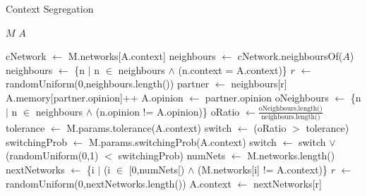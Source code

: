 \documentclass{article}
\begin{document}
  
    \begin{algorithm}
    \caption{Context Segregation}
    \label{model:context_segregation}
    \begin{algorithmic}
    \vspace{0.5em}
    \STATE $M$ 
    \STATE $A$ 
    \\ \hrulefill 
    
    \STATE{}
    \STATE cNetwork $\leftarrow$ M.networks[A.context]
    \STATE 
    \STATE {}
    \STATE neighbours $\leftarrow$ cNetwork.neighboursOf($A$) 
    \STATE {}
    \STATE neighbours $\leftarrow$ \{n $|$ n $\in$ neighbours $\wedge$ (n.context = A.context)\}
    \STATE
     \STATE{} 
    \STATE $r$ $\leftarrow$ randomUniform(0,neighbours.length())
    \STATE partner $\leftarrow$ neighbours[r]
    \STATE
    \STATE {}
     \STATE {}
    \STATE A.memory[partner.opinion]++
    \STATE A.opinion $\leftarrow$ partner.opinion
    \ENDIF
    \STATE
    \STATE {}
    \STATE {}
    \STATE oNeighbours $\leftarrow$ \{n $|$ n $\in$ neighbours $\wedge$ (n.opinion != A.opinion)\}
    \STATE
    \STATE oRatio $\leftarrow \frac{\text{oNeighbours.length()}}{\text{neighbours.length()}}$
    \STATE
    \STATE tolerance $\leftarrow$ M.params.tolerance(A.context)
    \STATE switch $\leftarrow$ (oRatio $>$ tolerance) 
    \STATE {}
    \STATE switchingProb $\leftarrow$ M.params.switchingProb(A.context)
    \STATE switch $\leftarrow$ switch $\lor$ (randomUniform(0,1) $<$ switchingProb)  
    \STATE 
    \STATE {}
  	\STATE numNets $\leftarrow$ M.networks.length()
   \STATE nextNetworks $\leftarrow$ \{i $|$ (i $\in$ [0,numNets[) $\wedge$ (M.networks[i] != A.context)\}
    \STATE $r$ $\leftarrow$ randomUniform(0,nextNetworks.length())
    \STATE A.context $\leftarrow$ nextNetworks[r]
    \ENDIF
    \end{algorithmic}
    \end{algorithm}
  
 
 
 
\end{document}
